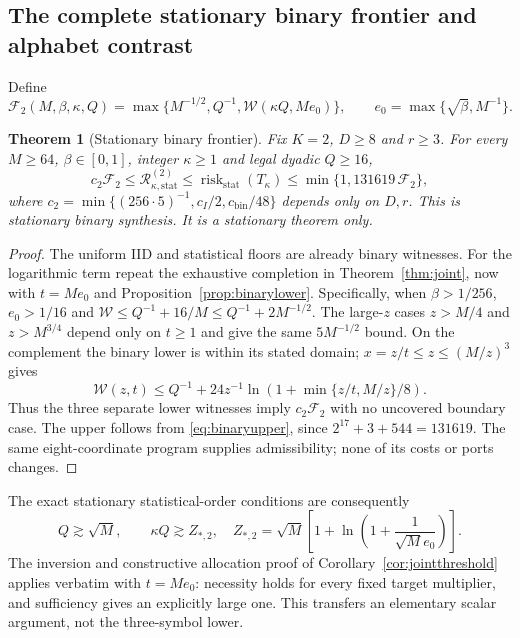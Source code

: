 \documentclass[11pt,letterpaper]{article}
\newtheorem{theorem}{Theorem}[section]
\theoremstyle{definition}\newtheorem{definition}[theorem]{Definition}
\theoremstyle{remark}\newtheorem{remark}[theorem]{Remark}
\newcommand{\Risk}{\mathcal{R}}
\begin{document}
\subsection{The complete stationary binary frontier and alphabet contrast}
Define
\[
 \mathcal F_2(M,\beta,\kappa,Q)
 =\max\{M^{-1/2},Q^{-1},\mathcal W(\kappa Q,Me_0)\},
 \qquad e_0=\max\{\sqrt\beta,M^{-1}\}.
\]
\begin{theorem}[Stationary binary frontier]\label{thm:binaryjoint}
Fix $K=2$, $D\ge8$ and $r\ge3$. For every $M\ge64$, $\beta\in[0,1]$, integer $\kappa\ge1$ and legal dyadic $Q\ge16$,
\begin{equation}\label{eq:binaryjoint}
 c_2\mathcal F_2\le\Risk_{\kappa,\mathrm{stat}}^{(2)}
 \le\operatorname{risk}_{\mathrm{stat}}(T_\kappa)
 \le\min\{1,131619\,\mathcal F_2\},
\end{equation}
where $c_2=\min\{(256\cdot5)^{-1},c_I/2,c_{\mathrm{bin}}/48\}$ depends only on $D,r$. This is stationary binary synthesis. It is a stationary theorem only.
\end{theorem}
\begin{proof}
The uniform IID and statistical floors are already binary witnesses. For the logarithmic term repeat the exhaustive completion in Theorem~\ref{thm:joint}, now with $t=Me_0$ and Proposition~\ref{prop:binarylower}. Specifically, when $\beta>1/256$, $e_0>1/16$ and
$\mathcal W\le Q^{-1}+16/M\le Q^{-1}+2M^{-1/2}$.
The large-$z$ cases $z>M/4$ and $z>M^{3/4}$ depend only on $t\ge1$ and give the same $5M^{-1/2}$ bound. On the complement the binary lower is within its stated domain; $x=z/t\le z\le(M/z)^3$ gives
\[
 \mathcal W(z,t)\le Q^{-1}
 +24z^{-1}\ln(1+\min\{z/t,M/z\}/8).
\]
Thus the three separate lower witnesses imply $c_2\mathcal F_2$ with no uncovered boundary case. The upper follows from \eqref{eq:binaryupper}, since
$2^{17}+3+544=131619$. The same eight-coordinate program supplies admissibility; none of its costs or ports changes.
\end{proof}

The exact stationary statistical-order conditions are consequently
\begin{equation}\label{eq:binarythreshold}
 Q\gtrsim\sqrt M,\qquad
 \kappa Q\gtrsim Z_{*,2},\quad
 Z_{*,2}=\sqrt M\left[1+\ln\left(1+\frac1{\sqrt M e_0}\right)\right].
\end{equation}
The inversion and constructive allocation proof of Corollary~\ref{cor:jointthreshold} applies verbatim with $t=Me_0$: necessity holds for every fixed target multiplier, and sufficiency gives an explicitly large one. This transfers an elementary scalar argument, not the three-symbol lower.
\end{document}
